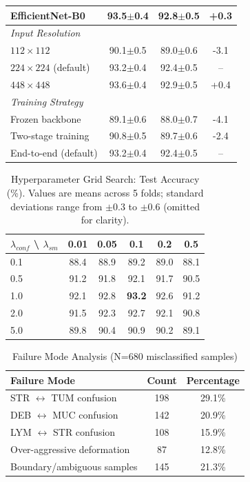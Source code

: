 \begin{table}[t]
\begin{tabularx}{\textwidth}{Xccc}
\quad EfficientNet-B0 & 93.5$\pm$0.4 & 92.8$\pm$0.5 & +0.3 \\
\hline
\multicolumn{4}{l}{\textit{Input Resolution}} \\
\quad $112 \times 112$ & 90.1$\pm$0.5 & 89.0$\pm$0.6 & -3.1 \\
\quad $224 \times 224$ (default) & 93.2$\pm$0.4 & 92.4$\pm$0.5 & -- \\
\quad $448 \times 448$ & 93.6$\pm$0.4 & 92.9$\pm$0.5 & +0.4 \\
\hline
\multicolumn{4}{l}{\textit{Training Strategy}} \\
\quad Frozen backbone & 89.1$\pm$0.6 & 88.0$\pm$0.7 & -4.1 \\
\quad Two-stage training & 90.8$\pm$0.5 & 89.7$\pm$0.6 & -2.4 \\
\quad End-to-end (default) & 93.2$\pm$0.4 & 92.4$\pm$0.5 & -- \\
\hline
\end{tabularx}
\end{table}
\begin{table}[t]
\centering
\caption{Hyperparameter Grid Search: Test Accuracy (\%). Values are means across 5 folds; standard deviations range from $\pm$0.3 to $\pm$0.6 (omitted for clarity).}
\label{tab:hyperparameter}
\begin{tabularx}{\textwidth}{X|ccccc}
\hline
$\lambda_{conf}$ \textbackslash{} $\lambda_{sm}$ & 0.01 & 0.05 & 0.1 & 0.2 & 0.5 \\
\hline
0.1 & 88.4 & 88.9 & 89.2 & 89.0 & 88.1 \\
0.5 & 91.2 & 91.8 & 92.1 & 91.7 & 90.5 \\
1.0 & 92.1 & 92.8 & \textbf{93.2} & 92.6 & 91.2 \\
2.0 & 91.5 & 92.3 & 92.7 & 92.1 & 90.8 \\
5.0 & 89.8 & 90.4 & 90.9 & 90.2 & 89.1 \\
\hline
\end{tabularx}
\end{table}
\begin{table}[t]
\centering
\caption{Failure Mode Analysis (N=680 misclassified samples)}
\label{tab:failure}
\begin{tabularx}{\textwidth}{Xcc}
\hline
\textbf{Failure Mode} & \textbf{Count} & \textbf{Percentage} \\
\hline
STR $\leftrightarrow$ TUM confusion & 198 & 29.1\% \\
DEB $\leftrightarrow$ MUC confusion & 142 & 20.9\% \\
LYM $\leftrightarrow$ STR confusion & 108 & 15.9\% \\
Over-aggressive deformation & 87 & 12.8\% \\
Boundary/ambiguous samples & 145 & 21.3\% \\
\hline
\end{tabularx}
\end{table}


